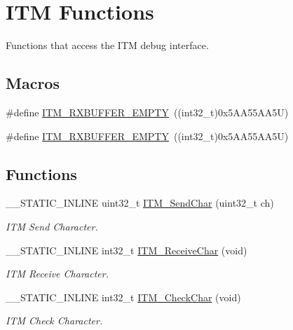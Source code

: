 \hypertarget{group___c_m_s_i_s__core___debug_functions}{}\section{I\+TM Functions}
\label{group___c_m_s_i_s__core___debug_functions}


Functions that access the I\+TM debug interface.  


\subsection*{Macros}
\begin{DoxyCompactItemize}
\item 
\#define \mbox{\hyperlink{group___c_m_s_i_s__core___debug_functions_gaa822cb398ee022b59e9e6c5d7bbb228a}{I\+T\+M\+\_\+\+R\+X\+B\+U\+F\+F\+E\+R\+\_\+\+E\+M\+P\+TY}}~((int32\+\_\+t)0x5\+A\+A55\+A\+A5\+U)
\item 
\#define \mbox{\hyperlink{group___c_m_s_i_s__core___debug_functions_gaa822cb398ee022b59e9e6c5d7bbb228a}{I\+T\+M\+\_\+\+R\+X\+B\+U\+F\+F\+E\+R\+\_\+\+E\+M\+P\+TY}}~((int32\+\_\+t)0x5\+A\+A55\+A\+A5\+U)
\end{DoxyCompactItemize}
\subsection*{Functions}
\begin{DoxyCompactItemize}
\item 
\+\_\+\+\_\+\+S\+T\+A\+T\+I\+C\+\_\+\+I\+N\+L\+I\+NE uint32\+\_\+t \mbox{\hyperlink{group___c_m_s_i_s__core___debug_functions_gac90a497bd64286b84552c2c553d3419e}{I\+T\+M\+\_\+\+Send\+Char}} (uint32\+\_\+t ch)
\begin{DoxyCompactList}\small\item\em I\+TM Send Character. \end{DoxyCompactList}\item 
\+\_\+\+\_\+\+S\+T\+A\+T\+I\+C\+\_\+\+I\+N\+L\+I\+NE int32\+\_\+t \mbox{\hyperlink{group___c_m_s_i_s__core___debug_functions_gac3ee2c30a1ac4ed34c8a866a17decd53}{I\+T\+M\+\_\+\+Receive\+Char}} (void)
\begin{DoxyCompactList}\small\item\em I\+TM Receive Character. \end{DoxyCompactList}\item 
\+\_\+\+\_\+\+S\+T\+A\+T\+I\+C\+\_\+\+I\+N\+L\+I\+NE int32\+\_\+t \mbox{\hyperlink{group___c_m_s_i_s__core___debug_functions_gae61ce9ca5917735325cd93b0fb21dd29}{I\+T\+M\+\_\+\+Check\+Char}} (void)
\begin{DoxyCompactList}\small\item\em I\+TM Check Character. \end{DoxyCompactList}\end{DoxyCompactItemize}
